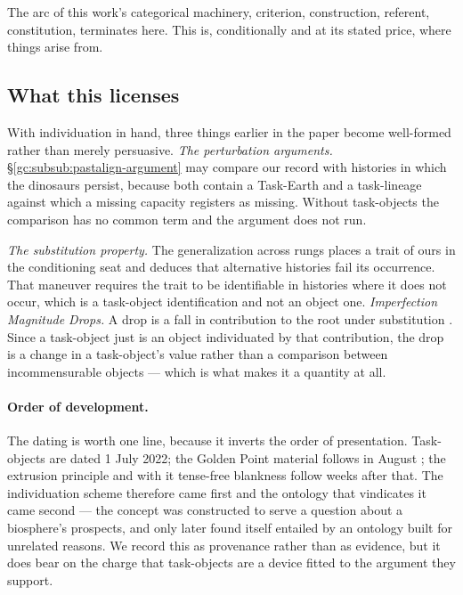 \documentclass[11pt]{article}
\numberwithin{equation}{section}
\theoremstyle{plain}
\theoremstyle{definition}
\theoremstyle{remark}
\begin{document}
The arc of this work's categorical machinery, criterion,
construction, referent, constitution, terminates here. This is,
conditionally and at its stated price, where things arise from.

\subsection{What this licenses}\label{to:sub:licenses}

With individuation in hand, three things earlier in the paper become
well-formed rather than merely persuasive. \emph{The perturbation arguments.} \S\ref{gc:subsub:pastalign-argument}
may compare our record with histories in which the dinosaurs persist,
because both contain a Task-Earth and a task-lineage against which a
missing capacity registers as missing. Without task-objects the
comparison has no common term and the argument does not run.

\emph{The substitution property.} The generalization across rungs
\cite{Nexus} places a trait of ours in the conditioning seat and
deduces that alternative histories fail its occurrence. That maneuver
requires the trait to be identifiable in histories where it does not
occur, which is a task-object identification and not an object one. \emph{Imperfection Magnitude Drops.} A drop is a fall in contribution to
the root under substitution \cite{Ben26Optimal}. Since a task-object
just is an object individuated by that contribution, the drop is a
change in a task-object's value rather than a comparison between
incommensurable objects --- which is what makes it a quantity at all.

\paragraph{Order of development.}\label{to:rem:order}
The dating is worth one line, because it inverts the order of
presentation. Task-objects are dated 1 July 2022; the Golden Point
material follows in August \cite{GoldenScience22}; the extrusion
principle and with it tense-free blankness follow weeks after that. The
individuation scheme therefore came first and the ontology that
vindicates it came second --- the concept was constructed to serve a
question about a biosphere's prospects, and only later found itself
entailed by an ontology built for unrelated reasons. We record this as
provenance rather than as evidence, but it does bear on the charge that
task-objects are a device fitted to the argument they support.
\end{document}
